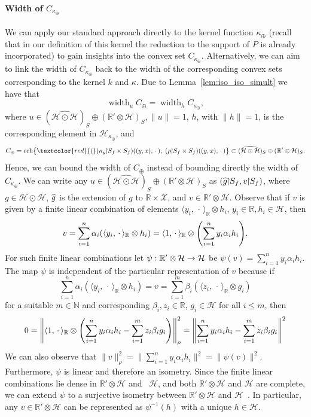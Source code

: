 \documentclass[AHL,Unicode,longabstracts,published]{cedram}
\theoremstyle{remark}
\DeclareMathOperator{\cch}{cch}
\DeclareMathOperator{\diam}{width}
\newcommand{\restrr}
{\!\!\upharpoonright\!\!}
\newcommand{\R}{\mathbb{R}}
\newcommand{\dR}{{\R'}}
\newcommand{\bbN}{\mathbb{N}}
\newcommand{\X}{\mathcal{X}}
\newcommand{\cH}{\mathcal{H}}
\let\oldhat\hat
\renewcommand*{\hat}[1]{\mathchoice{\widehat{#1}}{\widehat{#1}}{\oldhat{#1}}{\oldhat{#1}}}
\renewcommand*{\to}{\mathchoice{\longrightarrow}{\rightarrow}{\rightarrow}{\rightarrow}}
\let\originalleft\left
\let\originalright\right
\renewcommand{\left}{\mathopen{}\mathclose\bgroup\originalleft}
\renewcommand{\right}{\aftergroup\egroup\originalright}
\begin{document}
\paragraph{Width of $C_{\kappa_\oplus}$}
We can apply our standard approach directly to the kernel function $\kappa_\oplus$ (recall that in our definition of this kernel the reduction to the support of $P$ is already incorporated) to gain insights into the convex set $C_{\kappa_\oplus}$. Alternatively, we can aim to link the width of $C_{\kappa_\oplus}$ back to the width of the corresponding convex sets corresponding to the kernel $k$ and $\kappa$. Due to Lemma~\ref{lem:iso_iso_simult} we have that
\[
\diam_{u} C_{\oplus} = \diam_{h} C_{\kappa_\oplus},
\]
where $u \in (\widehat{\cH \odot \cH})_S \oplus (\R' \otimes \cH)_S, \|u\| =1$, $h$, with $\|h\|=1$, is the corresponding element in $\cH_{\kappa_\oplus}$, and
\[
C_\oplus = \cch\bigl\{ \textcolor{red}{(}(\kappa_y \restrr S_f \times S_f)((y,x),\,\cdot\,),\; (\rho \restrr S_f \times S_f)((y,x),\,\cdot\,)\bigr\}\subset (\widehat{\cH \odot \cH})_S \oplus (\R' \otimes \cH)_S.
\]
Hence, we can bound the width of $C_\oplus$ instead of bounding directly the width of $C_{\kappa_\oplus}$. We can write any $u \in (\widehat{\cH \odot \cH})_S \oplus (\R' \otimes \cH)_S$ as $(\hat g\restrr S_f,v\restrr S_f)$, where $g \in \cH \odot \cH$, $\hat g$ is the extension of $g$ to $\R \times \X$, and $v \in \dR \otimes \cH$. Observe that if $v$ is given by a finite linear combination of elements $\langle y_i,\,\cdot\, \rangle_\R \otimes h_i$, $y_i \in \R, h_i \in \cH$, then
\begin{equation}\label{eq:dir_tens_helper}
v = \sum_{i=1}^n \alpha_i (\langle y_i, \,\cdot\, \rangle_\R \otimes h_i) = \langle 1, \,\cdot\, \rangle_\R \otimes \left(
\sum_{i=1}^n y_i \alpha_i h_i \right).
\end{equation}
For such finite linear combinations let $\psi: \dR \otimes \cH \to \cH$ be $\psi(v) =\sum_{i=1}^n y_i \alpha_i h_i$. The map $\psi$ is independent of the particular representation of $v$ because if
\[
\sum_{i=1}^n \alpha_i (\langle y_i, \,\cdot\, \rangle_\R \otimes h_i) = v = \sum_{i=1}^m \beta_i (\langle z_i, \,\cdot\, \rangle_\R \otimes g_i)
\]
for a suitable $m\in\bbN$ and corresponding $\beta_i,z_i \in \R$, $g_i \in \cH$ for all $i \leq m$, then
\[
0 = \left\| \langle 1, \,\cdot\, \rangle_\R \otimes \left(\sum_{i=1}^n y_i \alpha_i h_i - \sum_{i=1}^m z_i \beta_i g_i\right) \right\|^2_\rho =
\left\|\sum_{i=1}^n y_i \alpha_i h_i - \sum_{i=1}^m z_i \beta_i g_i\right\|^2
\]
We can also observe that $\|v\|^2_\rho = \| \sum_{i=1}^n y_i \alpha_i h_i\|^2 = \|\psi(v)\|^2$. Furthermore, $\psi$ is linear and therefore an isometry. Since the finite linear combinations lie dense in $\dR \otimes \cH$ and ~$\cH$, and both $\dR \otimes \cH$ and $\cH$ are complete, we can extend $\psi$ to a surjective isometry between $\dR \otimes \cH$ and $\cH$~\cite[Corollary~4.3.18]{ENG89}. In particular, any $v \in \dR \otimes \cH$ can be represented as $\psi^{-1}(h)$ with a unique $h\in \cH$.
\end{document}

